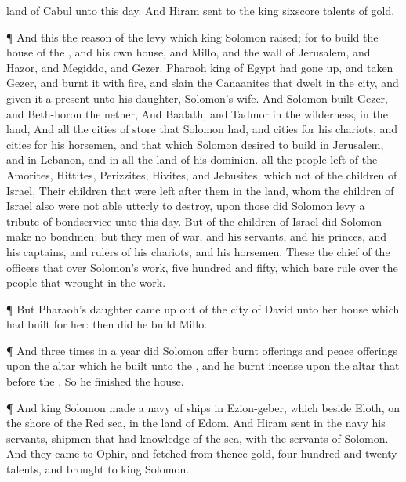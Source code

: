 {land of
Cabul unto this
day.
And
Hiram
sent to the
king
sixscore
talents of
gold.
\par }{\PP {}¶ And this
{} the
reason of the
levy which
king
Solomon
raised; for to
build the
house of the
{}, and his own
house, and
Millo, and the
wall of
Jerusalem, and
Hazor, and
Megiddo, and
Gezer.
Pharaoh
king of
Egypt had gone
up, and
taken
Gezer, and
burnt it with
fire, and
slain the
Canaanites that
dwelt in the
city, and
given it
{} a
present unto his
daughter,
Solomon’s
wife.
And
Solomon
built
Gezer, and
Beth-horon the
nether,
And
Baalath, and
Tadmor in the
wilderness, in the
land,
And all the
cities of
store that
Solomon had, and
cities for his
chariots, and
cities for his
horsemen, and
that which
Solomon
desired to
build in
Jerusalem, and in
Lebanon, and in all the
land of his
dominion.
 all the
people
{}
left of the
Amorites,
Hittites,
Perizzites,
Hivites, and
Jebusites, which
{} not of the
children of
Israel,
Their
children that were
left
after them in the
land, whom the
children of
Israel also were not
able utterly to
destroy, upon those did
Solomon
levy a
tribute of
bondservice unto this
day.
But of the
children of
Israel did
Solomon
make no
bondmen: but they
{}
men of
war, and his
servants, and his
princes, and his
captains, and
rulers of his
chariots, and his
horsemen.
These
{} the
chief of the
officers that
{} over
Solomon’s
work,
five
hundred and
fifty, which bare
rule over the
people that
wrought in the
work.
\par }{\PP {}¶ But
Pharaoh’s
daughter came
up out of the
city of
David unto her
house which
{} had
built for her: then did he
build
Millo.
\par }{\PP {}¶ And
three
times in a
year did
Solomon
offer burnt
offerings and peace
offerings upon the
altar which he
built unto the
{}, and he burnt
incense upon the
altar that
{}
before the
{}. So he
finished the
house.
\par }{\PP {}¶ And
king
Solomon
made a navy of
ships in
Ezion-geber, which
{} beside
Eloth, on the
shore of the
Red
sea, in the
land of
Edom.
And
Hiram
sent in the
navy his
servants,
shipmen that had
knowledge of the
sea, with the
servants of
Solomon.
And they
came to
Ophir, and
fetched from thence
gold,
four
hundred and
twenty
talents, and
brought
{} to
king
Solomon.

}
